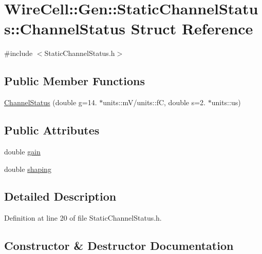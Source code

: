 \hypertarget{struct_wire_cell_1_1_gen_1_1_static_channel_status_1_1_channel_status}{}\section{Wire\+Cell\+:\+:Gen\+:\+:Static\+Channel\+Status\+:\+:Channel\+Status Struct Reference}
\label{struct_wire_cell_1_1_gen_1_1_static_channel_status_1_1_channel_status}


{\ttfamily \#include $<$Static\+Channel\+Status.\+h$>$}

\subsection*{Public Member Functions}
\begin{DoxyCompactItemize}
\item 
\hyperlink{struct_wire_cell_1_1_gen_1_1_static_channel_status_1_1_channel_status_aa2e691b84184891182f0f1ec9e24c7e0}{Channel\+Status} (double g=14. $\ast$units\+::mV/units\+::fC, double s=2. $\ast$units\+::us)
\end{DoxyCompactItemize}
\subsection*{Public Attributes}
\begin{DoxyCompactItemize}
\item 
double \hyperlink{struct_wire_cell_1_1_gen_1_1_static_channel_status_1_1_channel_status_aabe75a41caa3badb912c1275f80a8bb9}{gain}
\item 
double \hyperlink{struct_wire_cell_1_1_gen_1_1_static_channel_status_1_1_channel_status_afc34bd7b708a082651976031e9ada9d2}{shaping}
\end{DoxyCompactItemize}


\subsection{Detailed Description}


Definition at line 20 of file Static\+Channel\+Status.\+h.



\subsection{Constructor \& Destructor Documentation}
\mbox{\label{struct_wire_cell_1_1_gen_1_1_static_channel_status_1_1_channel_status_aa2e691b84184891182f0f1ec9e24c7e0}} 
